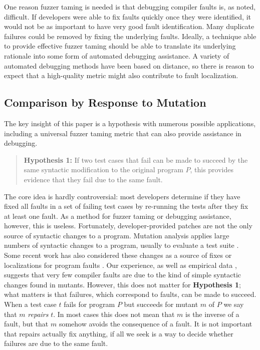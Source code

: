 One reason fuzzer taming is needed is that debugging compiler faults is, as noted, difficult.  If developers were able to fix faults quickly once they were identified, it would not be as important to have very good fault identification.  Many duplicate failures could be removed by fixing the underlying faults.  Ideally, a technique able to provide effective fuzzer taming should be able to translate its underlying rationale into some form of automated debugging assistance.   A variety of automated debugging methods \cite{NearNeighbor,GroceError} have been based on distance, so there is reason to expect that a high-quality metric might also contribute to fault localization.

\subsection{Comparison by Response to Mutation}

The key insight of this paper is a hypothesis with numerous possible applications, including a universal fuzzer taming metric that can also provide assistance in debugging.  

\begin{quote}
{\bf Hypothesis 1:} If two test cases that fail can be made to succeed by the same syntactic modification to the original program $P$, this provides evidence that they fail due to the same fault.
\end{quote}

The core idea is hardly controversial:  most developers determine if they have fixed all faults in a set of failing test cases by re-running the tests after they fix at least one fault.  As a method for fuzzer taming or debugging assistance, however, this is useless.  Fortunately, developer-provided patches are not the only source of syntactic changes to a program.  Mutation analysis \cite{demillo1978hints,budd1980theoretical} applies large numbers of syntactic changes to a program, usually to evaluate a test suite \cite{mutant,justmutants}.  Some recent work has also considered these changes as a source of fixes or localizations for program faults \cite{achour,multilingual,MUSE,DebroyMutant}.  Our experience, as well as empirical data \cite{GopinathMutants}, suggests that very few compiler faults are due to the kind of simple syntactic changes found in mutants.  However, this does not matter for {\bf Hypothesis 1};  what matters is that failures, which correspond to faults, can be made to succeed.  When a test case $t$ fails for program $P$ but succeeds for mutant $m$ of $P$ we say that $m$ \emph{repairs} $t$.  In most cases this does not mean that $m$ is the inverse of a fault, but that $m$ somehow avoids the consequence of a fault.  It is not important that repairs actually fix anything, if all we seek is a way to decide whether failures are due to the same fault.

